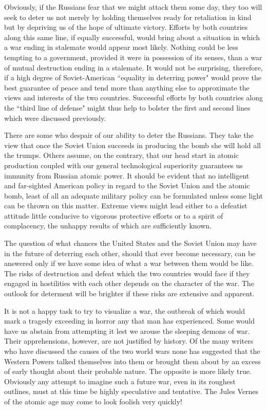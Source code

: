 Obviously, if the Russians fear that we might attack them some day, they too will seek to deter us not merely by holding themselves ready for retaliation in kind but by depriving us of the hope of ultimate victory. Efforts by both countries along this same line, if equally successful, would bring about a situation in which a war ending in stalemate would appear most likely. Nothing could be less tempting to a government, provided it were in possession of its senses, than a war of mutual destruction ending in a stalemate. It would not be surprising, therefore, if a high degree of Soviet-American ``equality in deterring power" would prove the best guarantee of peace and tend more than anything else to approximate the views and interests of the two countries. Successful efforts by both countries along the ``third line of defense" might thus help to bolster the first and second lines which were discussed previously.

There are some who despair of our ability to deter the Russians. They take the view that once the Soviet Union succeeds in producing the bomb she will hold all the trumps. Others assume, on the contrary, that our head start in atomic production coupled with our general technological superiority guarantees us immunity from Russian atomic power. It should be evident that no intelligent and far-sighted American policy in regard to the Soviet Union and the atomic bomb, least of all an adequate military policy can be formulated unless some light can be thrown on this matter. Extreme views might lead either to a defeatist attitude little conducive to vigorous protective efforts or to a spirit of complacency, the unhappy results of which are sufficiently known.

The question of what chances the United States and the Soviet Union may have in the future of deterring each other, should that ever become necessary, can be answered only if we have some idea of what a war between them would be like. The risks of destruction and defeat which the two countries would face if they engaged in hostilities with each other depends on the character of the war. The outlook for determent will be brighter if these risks are extensive and apparent.

It is not a happy task to try to visualize a war, the outbreak of which would mark a tragedy exceeding in horror any that man has experienced. Some would have us abstain from attempting it lest we arouse the sleeping demons of war. Their apprehensions, however, are not justified by history. Of the many writers who have discussed the causes of the two world wars none has suggested that the Western Powers talked themselves into them or brought them about by an excess of early thought about their probable nature. The opposite is more likely true. Obviously any attempt to imagine such a future war, even in its roughest outlines, must at this time be highly speculative and tentative. The Jules Vernes of the atomic age may come to look foolish very quickly!

